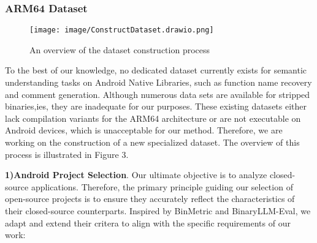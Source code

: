 \documentclass[acmsmall,screen,review,anonymous]{acmart} %
\begin{document}
\subsubsection{ARM64 Dataset}
\begin{figure}[h] %
    \centering
    \texttt{[image: image/ConstructDataset.drawio.png]} %
    \caption{An overview of the dataset construction process} %
    \label{fig:construct-dataset} %
\end{figure}

To the best of our knowledge, no dedicated dataset currently exists for semantic understanding tasks on Android Native Libraries, such as function name recovery and comment generation. Although numerous data sets are available for stripped binaries,ies, they are inadequate for our purposes. These existing datasets either lack compilation variants for the ARM64 architecture or are not executable on Android devices, which is unacceptable for our method. Therefore, we are working on the construction of a new specialized dataset. The overview of this process is illustrated in Figure 3.

\textbf{1)Android Project Selection}. Our ultimate objective is to analyze closed-source applications. Therefore, the primary principle guiding our selection of open-source projects is to ensure they accurately reflect the characteristics of their closed-source counterparts. Inspired by BinMetric and BinaryLLM-Eval, we adapt and extend their critera to align with the specific requirements of our work:
\end{document}

